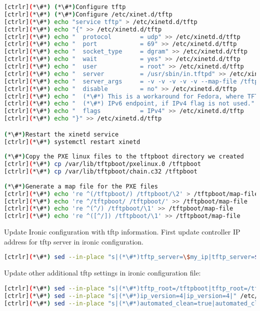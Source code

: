 \begin{lstlisting}[language=bash,keywords={}]
[ctrlr](*\#*) (*\#*)Configure tftp 
[ctrlr](*\#*) (*\#*)Configure /etc/xinet.d/tftp
[ctrlr](*\#*) echo "service tftp" > /etc/xinetd.d/tftp
[ctrlr](*\#*) echo "{" >> /etc/xinetd.d/tftp
[ctrlr](*\#*) echo "  protocol        = udp" >> /etc/xinetd.d/tftp
[ctrlr](*\#*) echo "  port            = 69" >> /etc/xinetd.d/tftp
[ctrlr](*\#*) echo "  socket_type     = dgram" >> /etc/xinetd.d/tftp
[ctrlr](*\#*) echo "  wait            = yes" >> /etc/xinetd.d/tftp
[ctrlr](*\#*) echo "  user            = root" >> /etc/xinetd.d/tftp
[ctrlr](*\#*) echo "  server          = /usr/sbin/in.tftpd" >> /etc/xinetd.d/tftp
[ctrlr](*\#*) echo "  server_args     = -v -v -v -v -v --map-file /tftpboot/map-file /tftpboot" >> /etc/xinetd.d/tftp
[ctrlr](*\#*) echo "  disable         = no" >> /etc/xinetd.d/tftp
[ctrlr](*\#*) echo "  (*\#*) This is a workaround for Fedora, where TFTP will listen only on" >> /etc/xinetd.d/tftp
[ctrlr](*\#*) echo "  (*\#*) IPv6 endpoint, if IPv4 flag is not used." >> /etc/xinetd.d/tftp
[ctrlr](*\#*) echo "  flags           = IPv4" >> /etc/xinetd.d/tftp
[ctrlr](*\#*) echo "}" >> /etc/xinetd.d/tftp

(*\#*)Restart the xinetd service
[ctrlr](*\#*) systemctl restart xinetd
    
(*\#*)Copy the PXE linux files to the tftpboot directory we created
[ctrlr](*\#*) cp /var/lib/tftpboot/pxelinux.0 /tftpboot
[ctrlr](*\#*) cp /var/lib/tftpboot/chain.c32 /tftpboot
    
(*\#*)Generate a map file for the PXE files
[ctrlr](*\#*) echo 're ^(/tftpboot/) /tftpboot/\2' > /tftpboot/map-file
[ctrlr](*\#*) echo 're ^/tftpboot/ /tftpboot/' >> /tftpboot/map-file
[ctrlr](*\#*) echo 're ^(^/) /tftpboot/\1' >> /tftpboot/map-file
[ctrlr](*\#*) echo 're ^([^/]) /tftpboot/\1' >> /tftpboot/map-file
\end{lstlisting}


Update Ironic configuration with tftp information. First update controller IP address for tftp server in ironic configuration.

\begin{lstlisting}[language=bash,keywords={}]
[ctrlr](*\#*) sed --in-place "s|(*\#*)tftp_server=\$my_ip|tftp_server=${controller_ip}|" /etc/ironic/ironic.conf
\end{lstlisting}

Update other additional tftp settings in ironic configuration file:


\begin{lstlisting}[language=bash,keywords={}]
[ctrlr](*\#*) sed --in-place "s|(*\#*)tftp_root=/tftpboot|tftp_root=/tftpboot|" /etc/ironic/ironic.conf
[ctrlr](*\#*) sed --in-place "s|(*\#*)ip_version=4|ip_version=4|" /etc/ironic/ironic.conf
[ctrlr](*\#*) sed --in-place "s|(*\#*)automated_clean=true|automated_clean=false|" /etc/ironic/ironic.conf
\end{lstlisting}

